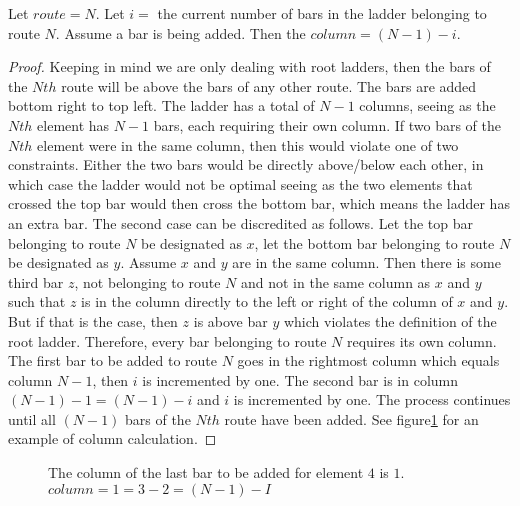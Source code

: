 \begin{lemma}
  Let $route=N$. Let $i=$ the current number of bars in the ladder belonging to route $N$. 
  Assume a bar is being added. Then the $column=(N-1)-i$.
\end{lemma}
\begin{proof}
  Keeping in mind we are only dealing with root ladders, then the bars of the $Nth$ route will be above the bars of 
  any other route. The bars are added bottom right to top left. The ladder has a total of $N-1$ columns, seeing as 
  the $Nth$ element has $N-1$ bars, each requiring their own column. If two bars of the $Nth$ element were 
  in the same column, then this would violate one of two constraints. Either the two bars would be directly 
  above/below each other, in which case the ladder would not be optimal seeing as the two elements that crossed the 
  top bar would then cross the bottom bar, which means the ladder has an extra bar. The second case can be discredited as 
  follows. Let the top bar belonging to route $N$ be designated as $x$, let the bottom bar belonging to route $N$ be 
  designated as $y$. Assume $x$ and $y$ are in the same column.
  Then there is some third bar $z$, not belonging to route $N$ and not in the same column 
  as $x$ and $y$ such that $z$ is in the column directly to the left or right of the column of $x$ and $y$. But if that 
  is the case, then $z$ is above bar $y$ which violates the definition of the root ladder. Therefore, every bar 
  belonging to route $N$ requires its own column. The first bar to be added to route $N$ goes in the rightmost column which 
  equals column $N-1$, then $i$ is incremented by one. The second bar is in column $(N-1)-1=(N-1)-i$ and $i$ is incremented 
  by one. The process continues until all $(N-1)$ bars of the $Nth$ route have been added. See figure\ref{fig:SJTcase2} for an example 
  of column calculation.
\end{proof}

\begin{figure}[!htp]
  \begin{center}
  \end{center}
  \caption{The column of the last bar to be added for element $4$ is $1$. $column=1=3-2=(N-1)-I$}
  \label{fig:SJTcase2}
\end{figure}


